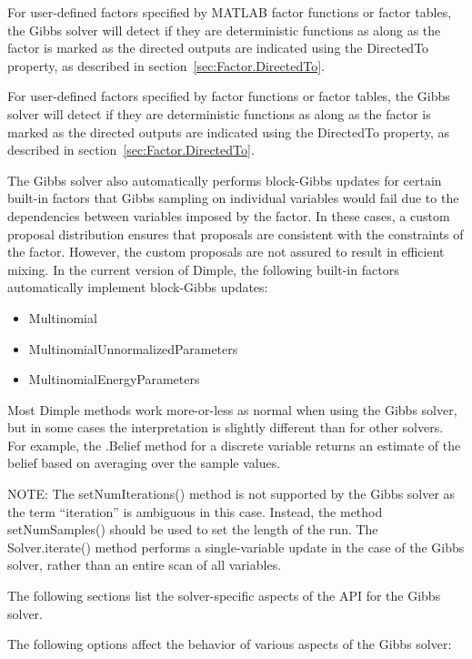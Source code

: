 \ifmatlab
For user-defined factors specified by MATLAB factor functions or factor tables, the Gibbs solver will detect if they are deterministic functions as along as the factor is marked as the directed outputs are indicated using the DirectedTo property, as described in section~\ref{sec:Factor.DirectedTo}.
\fi

\ifjava
For user-defined factors specified by factor functions or factor tables, the Gibbs solver will detect if they are deterministic functions as along as the factor is marked as the directed outputs are indicated using the DirectedTo property, as described in section~\ref{sec:Factor.DirectedTo}.
\fi
 
The Gibbs solver also automatically performs block-Gibbs updates for certain built-in factors that Gibbs sampling on individual variables would fail due to the dependencies between variables imposed by the factor.  In these cases, a custom proposal distribution ensures that proposals are consistent with the constraints of the factor.  However, the custom proposals are not assured to result in efficient mixing.  In the current version of Dimple, the following built-in factors automatically implement block-Gibbs updates:
%
\begin{itemize}
\item Multinomial
\item MultinomialUnnormalizedParameters
\item MultinomialEnergyParameters
\end{itemize}


Most Dimple methods work more-or-less as normal when using the Gibbs solver, but in some cases the interpretation is slightly different than for other solvers. For example, the .Belief method for a discrete variable returns an estimate of the belief based on averaging over the sample values.

NOTE: The setNumIterations() method is not supported by the Gibbs solver as the term ``iteration'' is ambiguous in this case. Instead, the method setNumSamples() should be used to set the length of the run. The Solver.iterate() method performs a single-variable update in the case of the Gibbs solver, rather than an entire scan of all variables.

The following sections list the solver-specific aspects of the API for the Gibbs solver.

\label{sec:GibbsOptions}

The following options affect the behavior of various aspects of the Gibbs solver:

